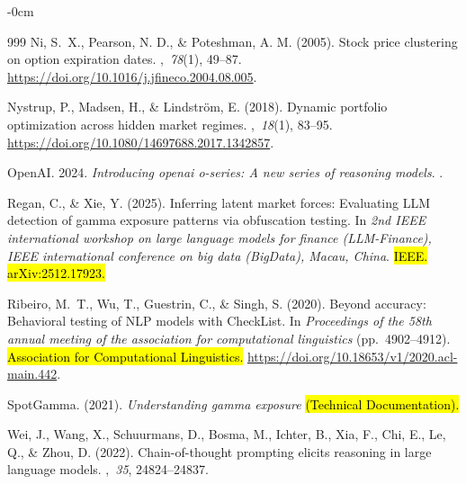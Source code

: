 \documentclass[jrfm,article,accept,moreauthors,pdftex]{Definitions/mdpi}
\begin{document}
\begin{adjustwidth}{-\extralength}{0cm}
\begin{thebibliography}{999}
Ni, S.~X., Pearson, N. D., \& Poteshman, A. M. (2005).
\newblock Stock price clustering on option expiration dates.
,~{\em 78\/}(1), 49--87.
\newblock
  \url{https://doi.org/10.1016/j.jfineco.2004.08.005}.

Nystrup, P., Madsen, H.,  \& Lindstr{\"o}m, E. (2018).
\newblock Dynamic portfolio optimization across hidden market regimes.
,~{\em 18\/}(1), 83--95.
\newblock
  \url{https://doi.org/10.1080/14697688.2017.1342857}.

{OpenAI}. 2024.
\newblock \textit{Introducing openai o-series: A new series of reasoning models}.
.

Regan, C., \& Xie, Y. (2025).
\newblock Inferring latent market forces: Evaluating {LLM} detection of gamma
  exposure patterns via obfuscation testing.
\newblock In {\em 2nd IEEE international workshop on large language models for
  finance (LLM-Finance), IEEE international conference on big data (BigData),
  Macau, China}. \hl{IEEE. arXiv:2512.17923.} %


Ribeiro, M.~T., Wu, T., Guestrin, C., \& Singh, S. (2020).
\newblock Beyond accuracy: Behavioral testing of {NLP} models with {CheckList}.
\newblock In {\em Proceedings of the 58th annual meeting of the association for
  computational linguistics} (pp.\  4902--4912).  \hl{Association for Computational Linguistics.} %
\newblock
  \url{https://doi.org/10.18653/v1/2020.acl-main.442}.

{SpotGamma}. (2021).
\newblock \textit{Understanding gamma exposure} \hl{(Technical Documentation).} %


Wei, J., Wang, X., Schuurmans, D., Bosma, M., Ichter, B., Xia, F., Chi, E., Le, Q., \& Zhou, D. (2022).
\newblock Chain-of-thought prompting elicits reasoning in large language
  models.
,~{\em 35},
  24824--24837.


\end{thebibliography}
\end{adjustwidth}
\end{document}
